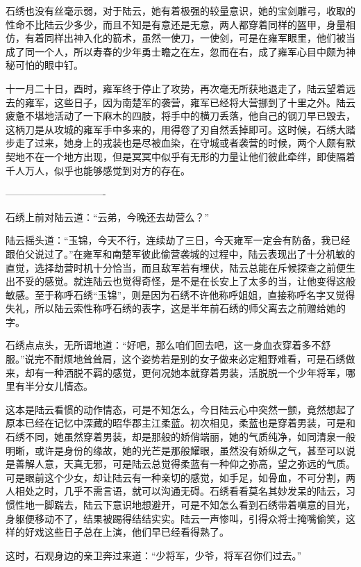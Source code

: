 石绣也没有丝毫示弱，对于陆云，她有着极强的较量意识，她的宝剑雕弓，收取的性命不比陆云少多少，而且不知是有意还是无意，两人都穿着同样的盔甲，身量相仿，有着同样出神入化的箭术，虽然一使刀，一使剑，可是在雍军眼里，他们被当成了同一个人，所以寿春的少年勇士瞻之在左，忽而在右，成了雍军心目中颇为神秘可怕的眼中钉。

十一月二十日，酉时，雍军终于停止了攻势，再次毫无所获地退走了，陆云望着远去的雍军，这些日子，因为南楚军的袭营，雍军已经将大营挪到了十里之外。陆云疲惫不堪地活动了一下麻木的四肢，将手中的横刀丢落，他自己的钢刀早已毁去，这柄刀是从攻城的雍军手中多来的，用得卷了刃自然丢掉即可。这时候，石绣大踏步走了过来，她身上的戎装也是尽被血染，在守城或者袭营的时候，两个人颇有默契地不在一个地方出现，但是冥冥中似乎有无形的力量让他们彼此牵绊，即使隔着千人万人，似乎也能够感觉到对方的存在。

-------------------------------

石绣上前对陆云道：“云弟，今晚还去劫营么？”

陆云摇头道：“玉锦，今天不行，连续劫了三日，今天雍军一定会有防备，我已经跟伯父说过了。”在雍军和南楚军彼此偷营袭城的过程中，陆云表现出了十分机敏的直觉，选择劫营时机十分恰当，而且敌军若有埋伏，陆云总能在斥候探查之前便生出不妥的感觉。就连陆云也觉得奇怪，是不是在长安上了太多的当，让他变得这般敏感。至于称呼石绣“玉锦”，则是因为石绣不许他称呼姐姐，直接称呼名字又觉得失礼，所以陆云索性称呼石绣的表字，这是半年前石绣的师父离去之前赠给她的字。

石绣点点头，无所谓地道：“好吧，那么咱们回去吧，这一身血衣穿着多不舒服。”说完不耐烦地耸耸肩，这个姿势若是别的女子做来必定粗野难看，可是石绣做来，却有一种洒脱不羁的感觉，更何况她本就穿着男装，活脱脱一个少年将军，哪里有半分女儿情态。

这本是陆云看惯的动作情态，可是不知怎么，今日陆云心中突然一颤，竟然想起了原本已经在记忆中深藏的昭华郡主江柔蓝。初次相见，柔蓝也是穿着男装，可是和石绣不同，她虽然穿着男装，却是那般的娇俏端丽，她的气质纯净，如同清泉一般明晰，或许是身份的缘故，她的光芒是那般耀眼，虽然没有娇纵之气，甚至可以说是善解人意，天真无邪，可是陆云总觉得柔蓝有一种仰之弥高，望之弥远的气质。可是眼前这个少女，却让陆云有一种亲切的感觉，如手足，如骨血，不可分割，两人相处之时，几乎不需言语，就可以沟通无碍。石绣看看莫名其妙发呆的陆云，习惯性地一脚踹去，陆云下意识地想避开，可是不知怎么看到石绣带着嗔意的目光，身躯便移动不了，结果被踢得结结实实。陆云一声惨叫，引得众将士掩嘴偷笑，这样的好戏这些日子总在上演，他们早已经看得熟了。

这时，石观身边的亲卫奔过来道：“少将军，少爷，将军召你们过去。”

